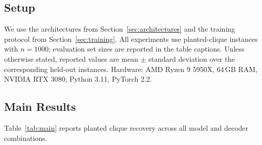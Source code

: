 \documentclass[11pt]{article}
\theoremstyle{plain}
\theoremstyle{remark}
\theoremstyle{plain}
\begin{document}
\subsection{Setup}
We use the architectures from Section~\ref{sec:architectures} and the training
protocol from Section~\ref{sec:training}. All experiments use planted-clique
instances with $n=1000$; evaluation set sizes are reported in the table captions.
Unless otherwise stated, reported values are mean $\pm$ standard deviation over
the corresponding held-out instances. Hardware: AMD Ryzen 9 5950X, 64\,GB RAM, NVIDIA RTX 3080;
Python 3.11, PyTorch 2.2.

\subsection{Main Results}
\label{sec:main_results}

Table~\ref{tab:main} reports planted clique recovery across all model and decoder
combinations.
\end{document}
